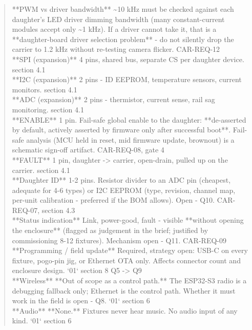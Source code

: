 \documentclass[11pt,a4paper]{article}
\begin{document}
\begin{quote}
\textbar{} {*}{*}PWM vs driver bandwidth{*}{*} \textbar{} \textasciitilde{}10 kHz must be checked against each daughter's LED driver dimming bandwidth (many constant-current modules accept only \textasciitilde{}1 kHz). If a driver cannot take it, that is a {*}{*}daughter-board driver selection problem{*}{*} - do not silently drop the carrier to 1.2 kHz without re-testing camera flicker. \textbar{} CAR-REQ-12 \textbar{}\\
\textbar{} {*}{*}SPI (expansion){*}{*} \textbar{} 4 pins, shared bus, separate CS per daughter device. \textbar{} section 4.1 \textbar{}\\
\textbar{} {*}{*}I2C (expansion){*}{*} \textbar{} 2 pins - ID EEPROM, temperature sensors, current monitors. \textbar{} section 4.1 \textbar{}\\
\textbar{} {*}{*}ADC (expansion){*}{*} \textbar{} 2 pins - thermistor, current sense, rail sag monitoring. \textbar{} section 4.1 \textbar{}\\
\textbar{} {*}{*}ENABLE{*}{*} \textbar{} 1 pin. Fail-safe global enable to the daughter: {*}{*}de-asserted by default, actively asserted by firmware only after successful boot{*}{*}. Fail-safe analysis (MCU held in reset, mid firmware update, brownout) is a schematic sign-off artifact. \textbar{} CAR-REQ-08, gate 4 \textbar{}\\
\textbar{} {*}{*}FAULT{*}{*} \textbar{} 1 pin, daughter -\textgreater{} carrier, open-drain, pulled up on the carrier. \textbar{} section 4.1 \textbar{}\\
\textbar{} {*}{*}Daughter ID{*}{*} \textbar{} 1-2 pins. Resistor divider to an ADC pin (cheapest, adequate for 4-6 types) or I2C EEPROM (type, revision, channel map, per-unit calibration - preferred if the BOM allows). Open - Q10. \textbar{} CAR-REQ-07, section 4.3 \textbar{}\\
\textbar{} {*}{*}Status indication{*}{*} \textbar{} Link, power-good, fault - visible {*}{*}without opening the enclosure{*}{*} (flagged as judgement in the brief; justified by commissioning 8-12 fixtures). Mechanism open - Q11. \textbar{} CAR-REQ-09 \textbar{}\\
\textbar{} {*}{*}Programming / field update{*}{*} \textbar{} Required, strategy open: USB-C on every fixture, pogo-pin jig, or Ethernet OTA only. Affects connector count and enclosure design. \textbar{} `01` section 8 Q5 -\textgreater{} Q9 \textbar{}\\
\textbar{} {*}{*}Wireless{*}{*} \textbar{} {*}{*}Out of scope as a control path.{*}{*} The ESP32-S3 radio is a debugging fallback only; Ethernet is the control path. Whether it must work in the field is open - Q8. \textbar{} `01` section 6 \textbar{}\\
\textbar{} {*}{*}Audio{*}{*} \textbar{} {*}{*}None.{*}{*} Fixtures never hear music. No audio input of any kind. \textbar{} `01` section 6 \textbar{}
\end{quote}
\end{document}
